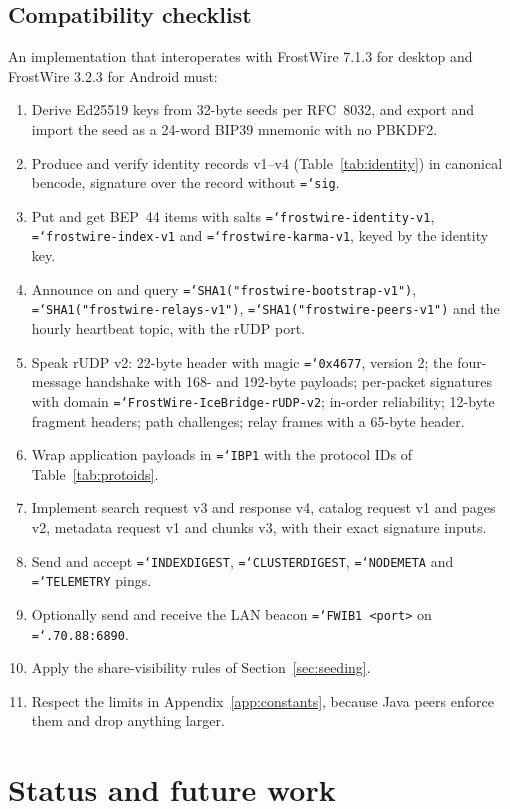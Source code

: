 \documentclass[11pt,a4paper]{article}
\newcommand{\code}[1]{\texttt{\hyphenchar\font=`\-\relax #1}}
\DeclareRobustCommand{\_}{\origunderscore\allowbreak}
\begin{document}
\subsection{Compatibility checklist}
An implementation that interoperates with FrostWire 7.1.3 for desktop and FrostWire 3.2.3 for
Android must:
\begin{enumerate}[label=\arabic*.]
\item Derive Ed25519 keys from 32-byte seeds per RFC~8032, and export and import the seed as a
  24-word BIP39 mnemonic with no PBKDF2.
\item Produce and verify identity records v1--v4 (Table~\ref{tab:identity}) in canonical
  bencode, signature over the record without \code{sig}.
\item Put and get BEP~44 items with salts \code{frostwire-identity-v1},
  \code{frostwire-index-v1} and \code{frostwire-karma-v1}, keyed by the identity key.
\item Announce on and query \code{SHA1("frostwire-bootstrap-v1")},
  \code{SHA1("frostwire-relays-v1")}, \code{SHA1("frostwire-peers-v1")} and the hourly
  heartbeat topic, with the rUDP port.
\item Speak rUDP v2: 22-byte header with magic \code{0x4677}, version 2; the four-message
  handshake with 168- and 192-byte payloads; per-packet signatures with domain
  \code{FrostWire-IceBridge-rUDP-v2}; in-order reliability; 12-byte fragment headers;
  path challenges; relay frames with a 65-byte header.
\item Wrap application payloads in \code{IBP1} with the protocol IDs of
  Table~\ref{tab:protoids}.
\item Implement search request v3 and response v4, catalog request v1 and pages v2, metadata
  request v1 and chunks v3, with their exact signature inputs.
\item Send and accept \code{INDEX\_DIGEST}, \code{CLUSTER\_DIGEST}, \code{NODE\_META} and
  \code{TELEMETRY} pings.
\item Optionally send and receive the LAN beacon \code{FWIB1 <port>} on
  \code{239.255.70.88:6890}.
\item Apply the share-visibility rules of Section~\ref{sec:seeding}.
\item Respect the limits in Appendix~\ref{app:constants}, because Java peers enforce them and
  drop anything larger.
\end{enumerate}

\section{Status and future work}
\label{sec:future}
\end{document}

